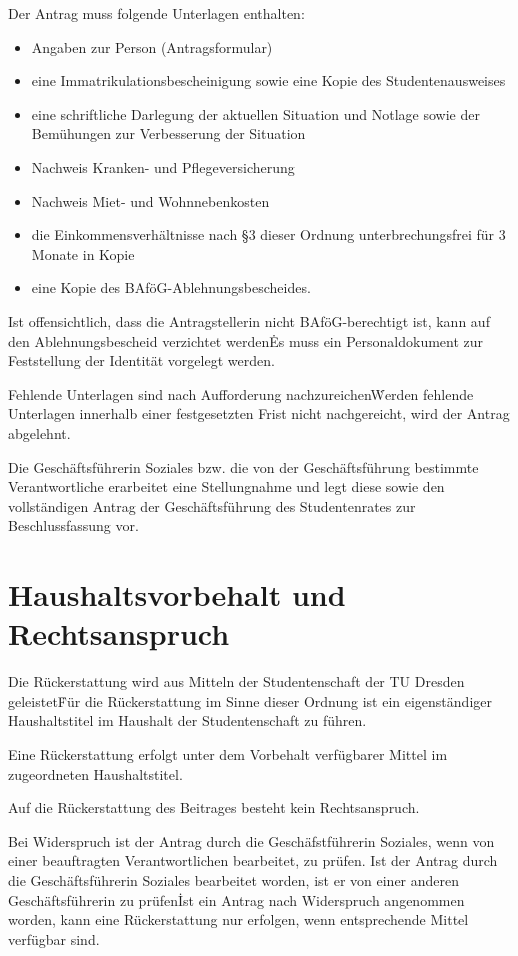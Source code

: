 \begin{multicols}{2}
\Abs \Satz Der Antrag muss folgende Unterlagen enthalten: 
\begin{itemize}
\item Angaben zur Person (Antragsformular) 
\item eine Immatrikulationsbescheinigung sowie eine Kopie des Studentenausweises
\item eine schriftliche Darlegung der aktuellen Situation und Notlage sowie der Bemühungen zur Verbesserung der Situation
\item Nachweis Kranken- und Pflegeversicherung
\item Nachweis Miet- und Wohnnebenkosten
\item die Einkommensverhältnisse nach §3 dieser Ordnung unterbrechungsfrei für 3 Monate in Kopie
\item eine Kopie des BAföG-Ablehnungsbescheides. 
\end{itemize}
\Satz Ist offensichtlich, dass die Antragstellerin nicht BAföG-berechtigt ist, kann auf den Ablehnungsbescheid verzichtet werden\. Es muss ein Personaldokument zur Feststellung der Identität vorgelegt werden.

\Abs \Satz Fehlende Unterlagen sind nach Aufforderung nachzureichen\. Werden fehlende Unterlagen innerhalb einer festgesetzten Frist nicht nachgereicht, wird der Antrag abgelehnt.

\Abs \Satz Die Geschäftsführerin Soziales bzw. die von der Geschäftsführung bestimmte Verantwortliche erarbeitet eine Stellungnahme und legt diese sowie den vollständigen Antrag der Geschäftsführung des Studentenrates zur Beschlussfassung vor.


\section{Haushaltsvorbehalt und Rechtsanspruch}

\Abs \Satz Die Rückerstattung wird aus Mitteln der Studentenschaft der TU Dresden geleistet\. Für die Rückerstattung im Sinne dieser Ordnung ist ein eigenständiger Haushaltstitel im Haushalt der Studentenschaft zu führen.

\Abs \Satz Eine Rückerstattung erfolgt unter dem Vorbehalt verfügbarer Mittel im zugeordneten Haushaltstitel.

\Abs \Satz Auf die Rückerstattung des Beitrages besteht kein Rechtsanspruch.

\Abs \Satz Bei Widerspruch ist der Antrag durch die Geschäfstführerin Soziales, wenn von einer beauftragten Verantwortlichen bearbeitet, zu prüfen. Ist der Antrag durch die Geschäftsführerin Soziales bearbeitet worden, ist er von einer anderen Geschäftsführerin zu prüfen\.
Ist ein Antrag nach Widerspruch angenommen worden, kann eine Rückerstattung nur erfolgen, wenn entsprechende Mittel verfügbar sind.



\end{multicols}
